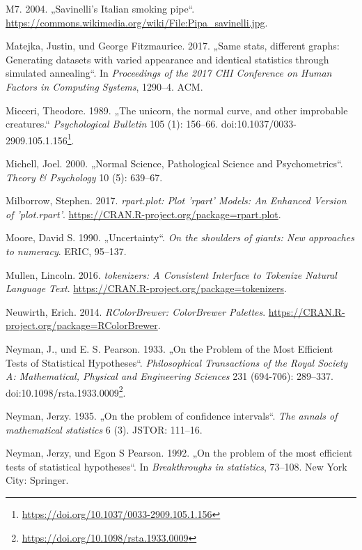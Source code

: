 \documentclass[12pt,ngerman,]{book}
\let\rmarkdownfootnote\footnote%
\def\footnote{\protect\rmarkdownfootnote}
\renewcommand{\href}[2]{#2\footnote{\url{#1}}}
\theoremstyle{definition}
\theoremstyle{definition}
\theoremstyle{remark}
\begin{document}
\hypertarget{ref-m7_savinellis_2004}{}
M7. 2004. „Savinelli's Italian smoking pipe``.
\url{https://commons.wikimedia.org/wiki/File:Pipa_savinelli.jpg}.

\hypertarget{ref-matejka2017same}{}
Matejka, Justin, und George Fitzmaurice. 2017. „Same stats, different
graphs: Generating datasets with varied appearance and identical
statistics through simulated annealing``. In \emph{Proceedings of the
2017 CHI Conference on Human Factors in Computing Systems}, 1290--4.
ACM.

\hypertarget{ref-Micceri1989}{}
Micceri, Theodore. 1989. „The unicorn, the normal curve, and other
improbable creatures.`` \emph{Psychological Bulletin} 105 (1): 156--66.
doi:\href{https://doi.org/10.1037/0033-2909.105.1.156}{10.1037/0033-2909.105.1.156}.

\hypertarget{ref-Michell2000}{}
Michell, Joel. 2000. „Normal Science, Pathological Science and
Psychometrics``. \emph{Theory \& Psychology} 10 (5): 639--67.

\hypertarget{ref-R-rpart.plot}{}
Milborrow, Stephen. 2017. \emph{rpart.plot: Plot 'rpart' Models: An
Enhanced Version of 'plot.rpart'}.
\url{https://CRAN.R-project.org/package=rpart.plot}.

\hypertarget{ref-moore1990uncertainty}{}
Moore, David S. 1990. „Uncertainty``. \emph{On the shoulders of giants:
New approaches to numeracy}. ERIC, 95--137.

\hypertarget{ref-R-tokenizers}{}
Mullen, Lincoln. 2016. \emph{tokenizers: A Consistent Interface to
Tokenize Natural Language Text}.
\url{https://CRAN.R-project.org/package=tokenizers}.

\hypertarget{ref-R-RColorBrewer}{}
Neuwirth, Erich. 2014. \emph{RColorBrewer: ColorBrewer Palettes}.
\url{https://CRAN.R-project.org/package=RColorBrewer}.

\hypertarget{ref-Neyman1933}{}
Neyman, J., und E. S. Pearson. 1933. „On the Problem of the Most
Efficient Tests of Statistical Hypotheses``. \emph{Philosophical
Transactions of the Royal Society A: Mathematical, Physical and
Engineering Sciences} 231 (694-706): 289--337.
doi:\href{https://doi.org/10.1098/rsta.1933.0009}{10.1098/rsta.1933.0009}.

\hypertarget{ref-neyman1935problem}{}
Neyman, Jerzy. 1935. „On the problem of confidence intervals``.
\emph{The annals of mathematical statistics} 6 (3). JSTOR: 111--16.

\hypertarget{ref-neyman1992problem}{}
Neyman, Jerzy, und Egon S Pearson. 1992. „On the problem of the most
efficient tests of statistical hypotheses``. In \emph{Breakthroughs in
statistics}, 73--108. New York City: Springer.
\end{document}
